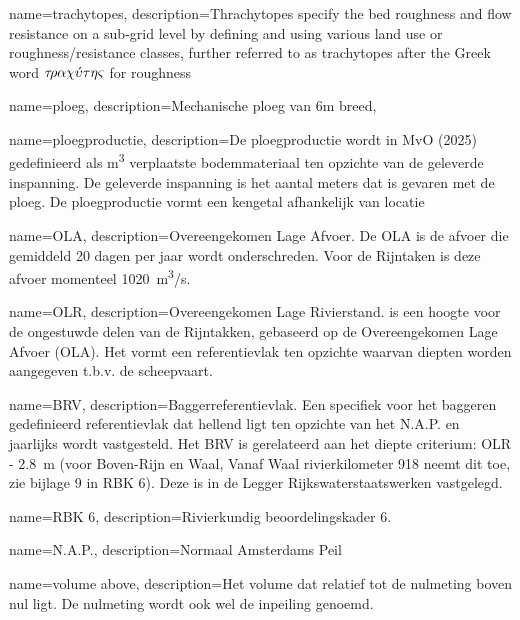 
{
	name=trachytopes,
	description={Thrachytopes specify the bed roughness and flow resistance on a sub-grid level by defining and using various land use or roughness/resistance classes, further referred to as trachytopes after the Greek word $\tau \negthinspace \rho \alpha \chi \acute{\upsilon} \tau \eta \varsigma$ for roughness \citep{fm_manual}} 
}

{
	name={ploeg},
    description={Mechanische ploeg van \si{6}{m} breed},
}

{
	name={ploegproductie},
	description={De ploegproductie wordt in MvO (2025) gedefinieerd als \si{m^3} verplaatste bodemmateriaal ten opzichte van de geleverde inspanning. De geleverde inspanning is het aantal meters dat is gevaren met de ploeg. De ploegproductie vormt een kengetal afhankelijk van locatie}
}


{
	name={OLA},
	description={Overeengekomen Lage Afvoer. De OLA is de afvoer die
		gemiddeld 20 dagen per jaar wordt onderschreden. Voor de
		Rijntaken is deze afvoer momenteel \SI{1020}{m^3/s}.}
}

{
	name={OLR},
	description={Overeengekomen Lage Rivierstand. is een hoogte voor de ongestuwde delen van de Rijntakken, gebaseerd op de Overeengekomen Lage Afvoer (OLA). Het vormt een referentievlak ten opzichte waarvan diepten worden aangegeven  t.b.v. de scheepvaart.}
}

{
	name={BRV},
	description={Baggerreferentievlak. Een specifiek voor het baggeren gedefinieerd referentievlak dat hellend ligt ten opzichte van het N.A.P. en jaarlijks wordt vastgesteld. Het BRV is gerelateerd aan het diepte criterium: OLR - \SI{2.8}{m} (voor Boven-Rijn en Waal, Vanaf Waal rivierkilometer 918 neemt dit toe, zie bijlage 9 in RBK 6). Deze is in de Legger Rijkswaterstaatswerken vastgelegd.}
}

{
	name={RBK 6},
	description={Rivierkundig beoordelingskader 6. \cite{RWS23}}
}


{
	name={N.A.P.},
	description={Normaal Amsterdams Peil}
}

{
	name={volume above},
	description={Het volume dat relatief tot de nulmeting boven nul ligt. De nulmeting wordt ook wel de inpeiling genoemd.}
}

